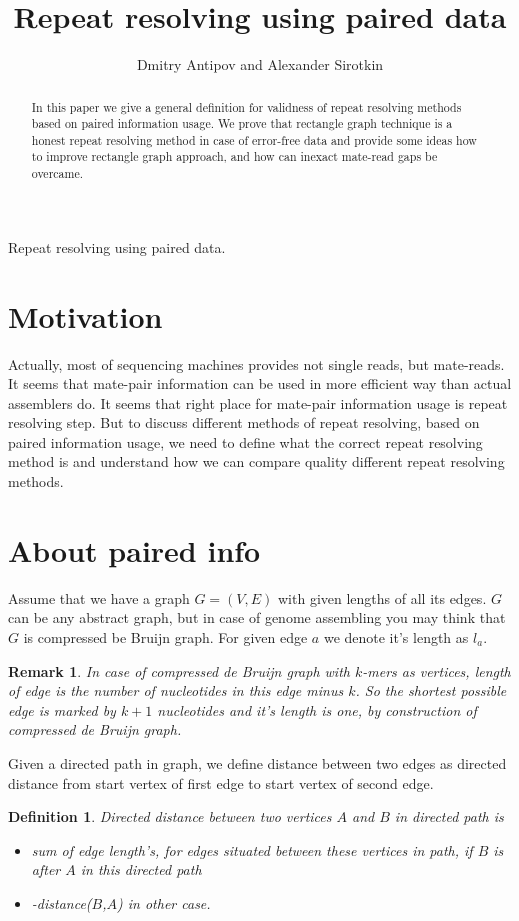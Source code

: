 \documentclass[12pt,a4paper,oneside]{article}
\title{Repeat resolving using paired data}
\author{Dmitry Antipov and Alexander Sirotkin}
\newtheorem{definition}{Definition}
\newtheorem{remark}{Remark}
\begin{document}
\maketitle

\begin{center}
Repeat resolving using paired data.
\end{center}
\begin{abstract}
 In this paper we give a general definition for validness of repeat resolving methods based on paired information usage. We prove that rectangle graph technique is a honest repeat resolving method in case of error-free data and provide some ideas how to improve rectangle graph approach, and how can inexact mate-read gaps be overcame.
\end{abstract}

\section{Motivation}
Actually, most of sequencing machines provides not single reads, but mate-reads. It seems that mate-pair information can be used in more efficient way than actual assemblers do. It seems that right place for mate-pair information usage is repeat resolving step.
But to discuss different methods of repeat resolving, based on paired information usage, we need to define what the correct repeat resolving method is and understand how we can compare quality different repeat resolving methods. 

\section{About paired info}

Assume that we have a graph $G=(V,E)$ with given lengths of all its edges. $G$ can be any abstract graph, but in case of genome assembling you may think that $G$ is compressed be Bruijn graph. 
For given edge $a$ we denote it's length as $l_a$. 
\begin{remark}
In case of compressed de Bruijn graph with $k$-mers as vertices, length of edge is the number of nucleotides in this edge minus $k$. So the shortest possible edge is marked by $k+1$ nucleotides and it's length is one, by construction of compressed de Bruijn graph. 
\end{remark}
Given a directed path in graph, we define distance between two edges as directed distance from start vertex of first edge to start vertex of second edge.
\begin{definition}
 Directed distance between two vertices $A$ and $B$ in directed path is 
\begin{itemize}
\item
  sum of edge length's, for edges situated between these vertices in path, if $B$ is after $A$ in this directed path
\item
  -distance($B$,$A$) in other case.
\end{itemize}
\end{definition}
\end{document}
